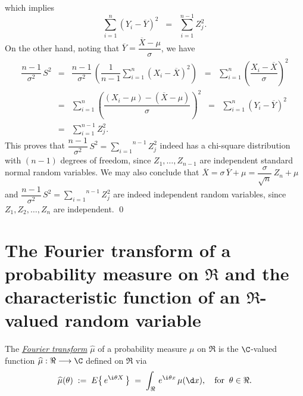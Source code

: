 \documentclass{article}
\begin{document}
which implies
\begin{equation*}
\sum_{i=1}^{n}\left(Y_{i}-\overline{Y}\right)^{2} \;\;=\;\; \sum_{i=1}^{n-1}Z_{j}^{2}.
\end{equation*}
On the other hand, noting that $\overline{Y} = \dfrac{\overline{X} - \mu}{\sigma}$, we have
\begin{eqnarray*}
           \dfrac{n-1}{\sigma^{2}}\,S^{2}
&=&     \dfrac{n-1}{\sigma^{2}}\,\left(\dfrac{1}{n-1}\sum_{i=1}^{n}\left(X_{i}-\overline{X}\right)^{2}\right)
\;\;=\;\;  \sum_{i=1}^{n}\left(\dfrac{X_{i}-\overline{X}}{\sigma}\right)^{2} \\
&=&     \sum_{i=1}^{n}\left(\dfrac{(X_{i}-\mu)-(\overline{X}-\mu)}{\sigma}\right)^{2}
\;\;=\;\;  \sum_{i=1}^{n}\left(Y_{i}-\overline{Y}\right)^{2} \\
&=&     \sum_{i=1}^{n-1}Z_{j}^{2}.
\end{eqnarray*}
This proves that $\dfrac{n-1}{\sigma^{2}}\,S^{2} = \overset{{n-1}}{\underset{i=1}{\sum}}Z_{j}^{2}$ indeed has a chi-square distribution with $(n-1)$ degrees of freedom, since $Z_{1}, \ldots, Z_{n-1}$ are independent standard normal random variables.  We may also conclude that $\overline{X} = \sigma\,\overline{Y} + \mu = \dfrac{\sigma}{\sqrt{n}}\,Z_{n} + \mu$ and $\dfrac{n-1}{\sigma^{2}}\,S^{2} = \overset{{n-1}}{\underset{i=1}{\sum}}Z_{j}^{2}$ are indeed independent random variables, since $Z_{1},Z_{2},\ldots,Z_{n}$ are independent.  \qed


\section{The Fourier transform of a probability measure on $\Re$ and the characteristic function of an $\Re$-valued random variable}
\setcounter{theorem}{0}

\begin{definition} \mbox{} \vskip 0.1cm \noindent
The \underline{\emph{Fourier transform}} $\widehat{\mu}$ of a probability measure $\mu$ on $\Re$ is the $\C$-valued function $\widehat{\mu} : \Re \longrightarrow \C$ defined on $\Re$ via
\begin{equation*}
\widehat{\mu}(\theta) \; := \; E\!\left\{\,e^{\i\theta X}\,\right\} \; = \; \int_{\Re} \, e^{\i\theta x} \, \mu(\d x),
\quad\textnormal{for}\;\; \theta \in \Re.
\end{equation*}
\end{definition}
\end{document}
